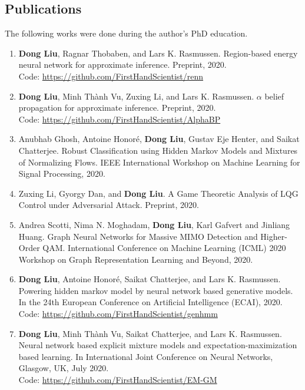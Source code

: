 \subsection{Publications}
The following works were done during the author's PhD education.
\begin{enumerate}
\item \label{pub-renn} \textbf{Dong Liu}, Ragnar Thobaben, and Lars K. Rasmussen. Region-based energy neural network for approximate inference. Preprint, 2020. \\
  Code: \href{https://github.com/FirstHandScientist/renn}{https://github.com/FirstHandScientist/renn}
\item \label{pub-alphabp-convergence}\textbf{Dong Liu}, Minh Th\`{a}nh Vu, Zuxing Li, and Lars K. Rasmussen. $\alpha$ belief propagation for approximate inference. Preprint, 2020.\\
  Code: \href{https://github.com/FirstHandScientist/AlphaBP}{https://github.com/FirstHandScientist/AlphaBP}

\item Anubhab Ghosh, Antoine Honor{\'e}, \textbf{Dong Liu}, Gustav Eje Henter, and Saikat Chatterjee. Robust Classification using Hidden Markov Models and Mixtures of Normalizing Flows. IEEE International Workshop on Machine Learning for Signal
Processing, 2020.

\item Zuxing Li, Gyorgy Dan, and \textbf{Dong Liu}. A Game Theoretic Analysis of LQG Control under Adversarial Attack. Preprint, 2020.

\item Andrea Scotti, Nima N. Moghadam, \textbf{Dong Liu}, Karl Gafvert and Jinliang Huang. Graph Neural Networks for Massive MIMO Detection and Higher-Order QAM. International Conference on Machine Learning (ICML) 2020 Workshop on Graph Representation Learning and Beyond, 2020.


\item \label{pub-hmm-flow} \textbf{Dong Liu}, Antoine Honor{\'e}, Saikat Chatterjee, and Lars K. Rasmussen. Powering hidden
  markov model by neural network based generative models. In the 24th European Conference on Artificial Intelligence (ECAI), 2020.\\
  Code: \href{https://github.com/FirstHandScientist/genhmm}{https://github.com/FirstHandScientist/genhmm}

\item \label{pub-em-flow} \textbf{Dong Liu}, Minh Th\`{a}nh Vu, Saikat Chatterjee, and Lars K. Rasmussen. Neural network based explicit mixture models and expectation-maximization based learning. In International Joint Conference on Neural Networks, Glasgow, UK, July 2020. \\
  Code: \href{https://github.com/FirstHandScientist/EM-GM}{https://github.com/FirstHandScientist/EM-GM}


\end{enumerate}

